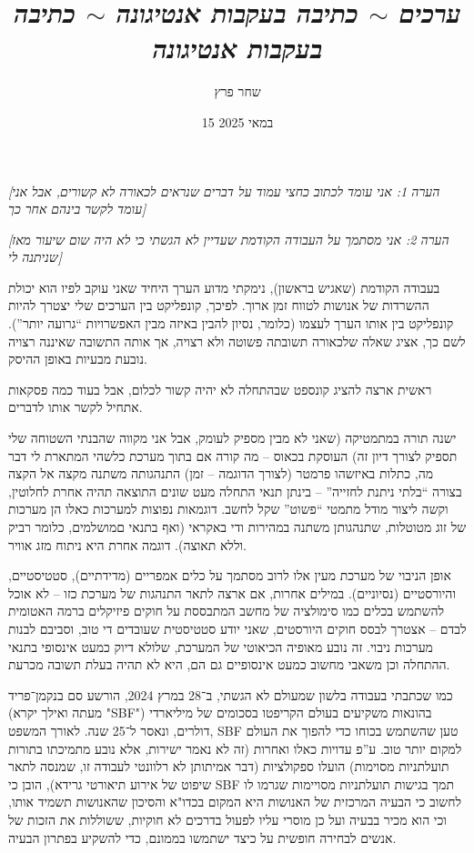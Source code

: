 \documentclass[]{article}
\author{\normalsize שחר פרץ}
\title{\Large \textit{ערכים $\sim$ כתיבה בעקבות אנטיגונה $\sim$ כתיבה בעקבות אנטיגונה}}
\date{\normalsize 15 במאי 2025}
\begin{document}
    \maketitle
    \small
    \textit{[הערה 1: אני עומד לכתוב כחצי עמוד על דברים שנראים לכאורה לא קשורים, אבל אני עומד לקשר בינהם אחר כך]}
    
    \textit{[הערה 2: אני מסתמך על העבודה הקודמת שעדיין לא הגשתי כי לא היה שום שיעור מאז שניתנה לי]}
    
    בעבודה הקודמת (שאגיש בראשון), נימקתי מדוע הערך היחיד שאני עוקב לפיו הוא יכולת ההשרדות של אנושות לטווח זמן ארוך. לפיכך, קונפליקט בין הערכים שלי יצטרך להיות קונפליקט בין אותו הערך לעצמו (כלומר, נסיון להבין באיזה מבין האפשרויות ``גרועה יותר''). לשם כך, אציג שאלה שלכאורה תשובתה פשוטה ולא רצויה, אך אותה התשובה שאיננה רצויה נובעת מבעיות באופן ההיסק. 
    
    ראשית ארצה להציג קונספט שבהתחלה לא יהיה קשור לכלום, אבל בעוד כמה פסקאות אתחיל לקשר אותו לדברים.  
    
    ישנה תורה במתמטיקה (שאני לא מבין מספיק לעומק, אבל אני מקווה שהבנתי השטוחה שלי תספיק לצורך דיון זה) העוסקת בכאוס – מה קורה אם בתוך מערכת כלשהי המתארת לי דבר מה, כתלות באיזשהו פרמטר (לצורך הדוגמה – זמן) התנהגותה משתנה מקצה אל הקצה בצורה ``בלתי ניתנת לחזייה'' – בינתן תנאי התחלה מעט שונים התוצאה תהיה אחרת לחלוטין, וקשה ליצור מודל מתמטי ``פשוט'' שקל לחשב. דוגמאות נפוצות למערכות כאלו הן מערכות של זוג מטוטלות, שתנהגותן משתנה במהירות ודי באקראי (ואף בתנאי םמושלמים, כלומר רביק וללא תאוצה). דוגמה אחרת היא ניתוח מזג אוויר. 
        
        אופן הניבוי של מערכת מעין אלו לרוב מסתמך על כלים אמפריים (מדידתיים), סטטיסטיים, והיורסטיים (נסיוניים). במילים אחרות, אם ארצה לתאר התנהגות של מערכת כזו – לא אוכל להשתמש בכלים כמו סימולציה של מחשב המתבססת על חוקים פיזיקלים ברמה האטומית לבדם – אצטרך לבסס חוקים היורסטים, שאני יודע סטטיסטית שעובדים די טוב, וסביבם לבנות מערכות ניבוי. זה נובע מאופיה הכיאוטי של המערכת, שלולא דיוק כמעט אינסופי בתנאי ההתחלה וכן משאבי מחשוב כמעט אינסופיים גם הם, היא לא תהיה בעלת תשובה מכרעת. 
    
    כמו שכתבתי בעבודה בלשון שמעולם לא הגשתי, ב־28 במרץ 2024, הורשע סם בנקמן־פריד (מעתה ואילך יקרא "SBF") בהונאות משקיעים בעולם הקריפטו בסכומים של מיליארדי דולרים, ונאסר ל־25 שנה. לאורך המשפט, SBF טען שהשתמש בכוחו כדי להפוך את העולם למקום יותר טוב. ע''פ עדויות כאלו ואחרות (זה לא נאמר ישירות, אלא נובע מתמיכתו בתורות תועלתניות מסוימות) הועלו ספקולציות (דבר אמיתותן לא רלוונטי לעבודה זו, שמנסה לתאר שיפוט של אירוע תיאורטי גרידא), הובן כי SBF תמך בגישות תועלתניות מסויימות שגרמו לו לחשוב כי הבעיה המרכזית של האנושות היא המקום בכדו"א והסיכון שהאנושות תשמיד אותו, וכי הוא מכיר בבעיה ועל כן מוסרי עליו לפעול בדרכים לא חוקיות, ששוללות את הזכות של אנשים לבחירה חופשית על כיצד ישתמשו בממונם, כדי להשקיע בפתרון הבעיה.
    
\end{document}
